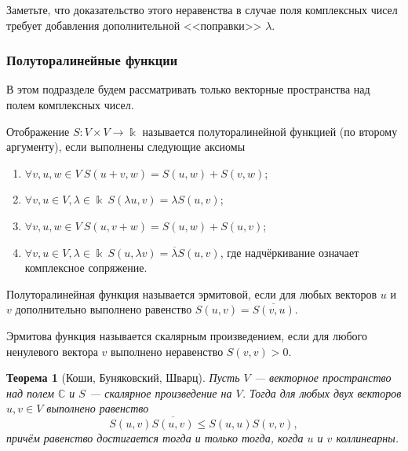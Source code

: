 \documentclass[12pt]{article}
\newtheorem{theorem}{Теорема}
\numberwithin{theorem}{section}
\theoremstyle{definition}
\newcommand{\defin}[2]{\hypertarget{#2}{{\color{red} #1}}}
\newcommand{\CC}{\mathbb{C}}
\begin{document}
	Заметьте, что доказательство этого неравенства в случае поля комплексных чисел требует добавления дополнительной <<поправки>> $ \lambda $.
	
	\subsubsection{Полуторалинейные функции}
	
	В этом подразделе будем рассматривать только векторные пространства над полем комплексных чисел.
	
	Отображение $ S \colon V \times V \to \Bbbk $ называется \defin{полуторалинейной функцией (по второму аргументу)}{sesquilinear}, если выполнены следующие аксиомы
	\begin{enumerate}
		\item $ \forall v,u,w \in V \ S(u + v, w) = S(u, w) + S(v, w) $;
		\item $ \forall v,u \in V, \lambda \in \Bbbk \ S(\lambda u, v) = \lambda S(u, v) $;
		\item $ \forall v,u,w \in V \ S(u, v + w) = S(u, w) + S(u, v) $;
		\item $ \forall v,u \in V, \lambda \in \Bbbk \ S(u, \lambda v) = \overline{\lambda} S(u, v) $,
		где надчёркивание означает комплексное сопряжение.
	\end{enumerate}
	
	Полуторалинейная функция называется \defin{эрмитовой}{hermitian}, если для любых векторов $ u $ и $ v $ дополнительно выполнено равенство
	$ S(u, v) = \overline{S(v, u)} $.
	
	Эрмитова функция называется \defin{скалярным произведением}{C-inner-product}, если для любого ненулевого вектора $ v $
	выполнено неравенство $ S(v, v) > 0 $.
	
	
	\begin{theorem}[Коши, Буняковский, Шварц] \label{Cauchy-complex}
		Пусть $ V $ --- векторное пространство над полем $ \CC $ и $ S $ --- скалярное произведение на $ V $.
		Тогда для любых двух векторов $ u, v \in V $ выполнено равенство
		$$ S(u, v)\overline{S(u,v)} \leqslant S(u,u)S(v,v), $$
		причём равенство достигается тогда и только тогда, когда $ u $ и $ v $ коллинеарны.
	\end{theorem}
	
\end{document}
